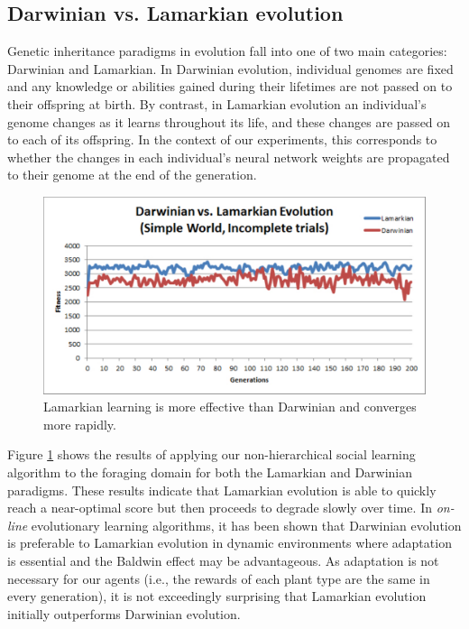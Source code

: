 \documentclass{acm_proc_article-sp}
\begin{document}
\subsection*{Darwinian vs. Lamarkian evolution}

Genetic inheritance paradigms in evolution fall into one of two main categories: Darwinian and Lamarkian. In Darwinian evolution, individual genomes are fixed and any knowledge or abilities gained during their lifetimes are not passed on to their offspring at birth. By contrast, in Lamarkian evolution an individual's genome changes as it learns throughout its life, and these changes are passed on to each of its offspring. In the context of our experiments, this corresponds to whether the changes in each individual's neural network weights are propagated to their genome at the end of the generation.

\begin{figure}
  \centering
    \includegraphics[scale=.35]{darwinian_vs_lamarkian_evolution.pdf}
  \caption{Lamarkian learning is more effective than Darwinian and converges more rapidly.}
  \label{fig:darwin-lamark}
\end{figure}


Figure \ref{fig:darwin-lamark} shows the results of applying our non-hierarchical social learning algorithm to the foraging domain for both the Lamarkian and Darwinian paradigms. These results indicate that Lamarkian evolution is able to quickly reach a near-optimal score but then proceeds to degrade slowly over time. In  \textit{on-line} evolutionary learning algorithms, it has been shown \cite{whiteson2006evolutionary} that Darwinian evolution is preferable to Lamarkian evolution in dynamic environments where adaptation is essential and the Baldwin effect \cite{simpson1953baldwin} may be advantageous. As adaptation is not necessary for our agents (i.e., the rewards of each plant type are the same in every generation), it is not exceedingly surprising that Lamarkian evolution initially outperforms Darwinian evolution.
\end{document}
